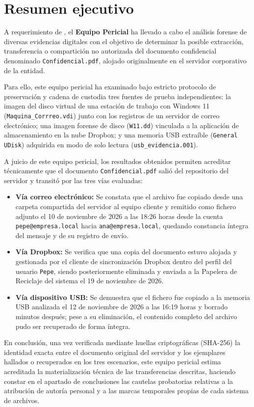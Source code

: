 \section{Resumen ejecutivo}

A requerimiento de \textbf{\Cliente}, el \textbf{Equipo Pericial \GrupoPracticas} ha llevado a cabo el análisis forense de diversas evidencias digitales con el objetivo de determinar la posible extracción, transferencia o compartición no autorizada del documento confidencial denominado \texttt{Confidencial.pdf}, alojado originalmente en el servidor corporativo de la entidad.

Para ello, este equipo pericial ha examinado bajo estricto protocolo de preservación y cadena de custodia tres fuentes de prueba independientes: la imagen del disco virtual de una estación de trabajo con Windows 11 (\texttt{Maquina\_Corrreo.vdi}) junto con los registros de un servidor de correo electrónico; una imagen forense de disco (\texttt{W11.dd}) vinculada a la aplicación de almacenamiento en la nube Dropbox; y una memoria USB extraíble (\texttt{General UDisk}) adquirida en modo de solo lectura (\texttt{usb\_evidencia.001}).

A juicio de este equipo pericial, los resultados obtenidos permiten acreditar técnicamente que el documento \texttt{Confidencial.pdf} salió del repositorio del servidor y transitó por las tres vías evaluadas:
\begin{itemize}[leftmargin=1.5em, itemsep=0.35em]
	\item \textbf{Vía correo electrónico:} Se constata que el archivo fue copiado desde una carpeta compartida del servidor al equipo cliente y remitido como fichero adjunto el 10 de noviembre de 2026 a las 18:26 horas desde la cuenta \texttt{pepe@empresa.local} hacia \texttt{ana@empresa.local}, quedando constancia íntegra del mensaje y de su registro de envío.
	\item \textbf{Vía Dropbox:} Se verifica que una copia del documento estuvo alojada y gestionada por el cliente de sincronización Dropbox dentro del perfil del usuario \texttt{Pepe}, siendo posteriormente eliminada y enviada a la Papelera de Reciclaje del sistema el 19 de noviembre de 2026.
	\item \textbf{Vía dispositivo USB:} Se demuestra que el fichero fue copiado a la memoria USB analizada el 12 de noviembre de 2026 a las 16:19 horas y borrado minutos después; pese a su eliminación, el contenido completo del archivo pudo ser recuperado de forma íntegra.
\end{itemize}

En conclusión, una vez verificada mediante huellas criptográficas (SHA-256) la identidad exacta entre el documento original del servidor y los ejemplares hallados o recuperados en los tres escenarios, este equipo pericial estima acreditada la materialización técnica de las transferencias descritas, haciendo constar en el apartado de conclusiones las cautelas probatorias relativas a la atribución de autoría personal y a las marcas temporales propias de cada sistema de archivos.